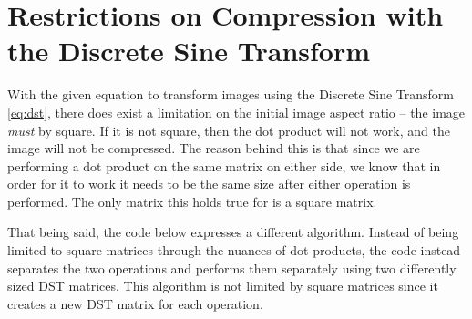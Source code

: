\section{Restrictions on Compression with the Discrete Sine Transform}
With the given equation to transform images using the Discrete Sine Transform \eqref{eq:dst}, there does exist a limitation on the initial image aspect ratio -- the image \textit{must} by square. If it is not square, then the dot product will not work, and the image will not be compressed. The reason behind this is that since we are performing a dot product on the same matrix on either side, we know that in order for it to work it needs to be the same size after either operation is performed. The only matrix this holds true for is a square matrix.

That being said, the code below expresses a different algorithm. Instead of being limited to square matrices through the nuances of dot products, the code instead separates the two operations and performs them separately using two differently sized DST matrices. This algorithm is not limited by square matrices since it creates a new DST matrix for each operation.

\newpage
    
